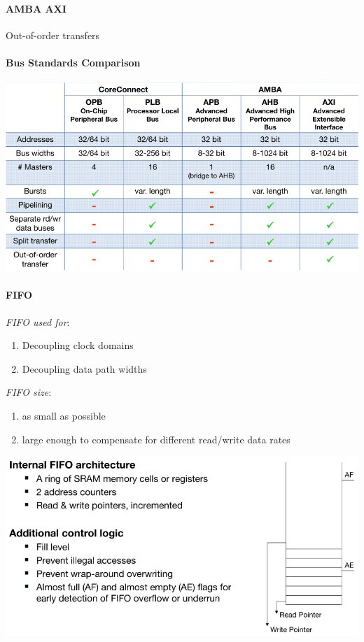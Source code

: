 \documentclass[english]{latex4ei/latex4ei_sheet}
\begin{document}
\paragraph{AMBA AXI} Out-of-order transfers

\paragraph{Bus Standards Comparison}
\begin{center}
	\includegraphics[width=0.75\linewidth]{images//6.Interconnects/BusComparison.png}
\end{center}


\paragraph{FIFO}

\textit{FIFO used for}:
\begin{enumerate}
	\item Decoupling clock domains
	\item Decoupling data path widths
\end{enumerate}
\textit{FIFO size}:
\begin{enumerate}
	\item as small as possible
	\item large enough to compensate for different read/write data rates
\end{enumerate}
\begin{center}
	\includegraphics[width=0.75\linewidth]{images//6.Interconnects/FIFO.png}
\end{center}
\end{document}
